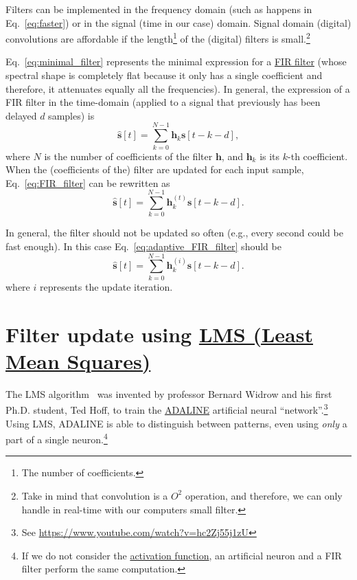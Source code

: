Filters can be implemented in the frequency domain (such as happens in
Eq.~\eqref{eq:faster}) or in the signal (time in our case)
domain. Signal domain (digital) convolutions are affordable if the
length\footnote{The number of coefficients.} of the (digital) filters
is small.\footnote{Take in mind that convolution is a $O^2$ operation,
  and therefore, we can only handle in real-time with our computers
  small filter.}

Eq.~\eqref{eq:minimal_filter} represents the minimal expression for a
\href{https://en.wikipedia.org/wiki/Finite_impulse_response}{FIR
  filter} (whose spectral shape is completely flat because it only has
a single coefficient and therefore, it attenuates equally all the
frequencies). In general, the expression of a FIR filter in the
time-domain (applied to a signal that previously has been delayed $d$
samples) is
\begin{equation}
  \hat{\mathbf s}[t] = \sum_{k=0}^{N-1}{\mathbf h}_k{\mathbf s}[t-k-d],
  \label{eq:FIR_filter}
\end{equation}
where $N$ is the number of coefficients of the filter ${\mathbf h}$,
and ${\mathbf h}_k$ is its $k$-th coefficient. When the (coefficients
of the) filter are updated for each input sample,
Eq.~\eqref{eq:FIR_filter} can be rewritten as
\begin{equation}
  \hat{\mathbf s}[t] = \sum_{k=0}^{N-1}{\mathbf h}_k^{(t)}{\mathbf s}[t-k-d].
  \label{eq:adaptive_FIR_filter}
\end{equation}

In general, the filter should not be updated so often (e.g., every
second could be fast enough). In this case
Eq.~\eqref{eq:adaptive_FIR_filter} should be
\begin{equation}
  \hat{\mathbf s}[t] = \sum_{k=0}^{N-1}{\mathbf h}_k^{(i)}{\mathbf s}[t-k-d].
  \label{eq:adaptive_FIR_filter_second}
\end{equation}
where $i$ represents the update iteration.

\section{Filter update using \href{https://en.wikipedia.org/wiki/Least_mean_squares_filter}{LMS (Least Mean Squares)}}

The LMS algorithm~\cite{haykin1995adaptive,boyd2004convex} was
invented by professor Bernard Widrow and his first Ph.D. student, Ted
Hoff, to train the
\href{https://en.wikipedia.org/wiki/ADALINE}{ADALINE} artificial
neural ``network''.\footnote{See
  \url{https://www.youtube.com/watch?v=hc2Zj55j1zU}} Using LMS,
ADALINE is able to distinguish between patterns, even using \emph{only} a
part of a single neuron.\footnote{If we do not consider the
  \href{https://en.wikipedia.org/wiki/Activation_function}{activation
    function}, an artificial neuron and a FIR filter perform the same
  computation.}

